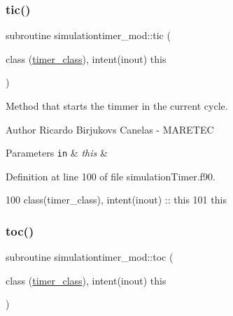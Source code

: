 \subsubsection{\texorpdfstring{tic()}{tic()}}
{\footnotesize\ttfamily subroutine simulationtimer\+\_\+mod\+::tic (\begin{DoxyParamCaption}\item[{class (\mbox{\hyperlink{structsimulationtimer__mod_1_1timer__class}{timer\+\_\+class}}), intent(inout)}]{this }\end{DoxyParamCaption})\hspace{0.3cm}{\ttfamily [private]}}



Method that starts the timmer in the current cycle. 

\begin{DoxyAuthor}{Author}
Ricardo Birjukovs Canelas -\/ M\+A\+R\+E\+T\+EC 
\end{DoxyAuthor}

\begin{DoxyParams}[1]{Parameters}
\mbox{\tt in}  & {\em this} & \\
\hline
\end{DoxyParams}


Definition at line 100 of file simulation\+Timer.\+f90.


\begin{DoxyCode}
100     class(timer\_class), \textcolor{keywordtype}{intent(inout)} :: this
101     this%
\end{DoxyCode}
\mbox{\label{namespacesimulationtimer__mod_ae5c4ca42de2cd1f446eee79112cedd14}} 
\subsubsection{\texorpdfstring{toc()}{toc()}}
{\footnotesize\ttfamily subroutine simulationtimer\+\_\+mod\+::toc (\begin{DoxyParamCaption}\item[{class (\mbox{\hyperlink{structsimulationtimer__mod_1_1timer__class}{timer\+\_\+class}}), intent(inout)}]{this }\end{DoxyParamCaption})\hspace{0.3cm}{\ttfamily [private]}}



